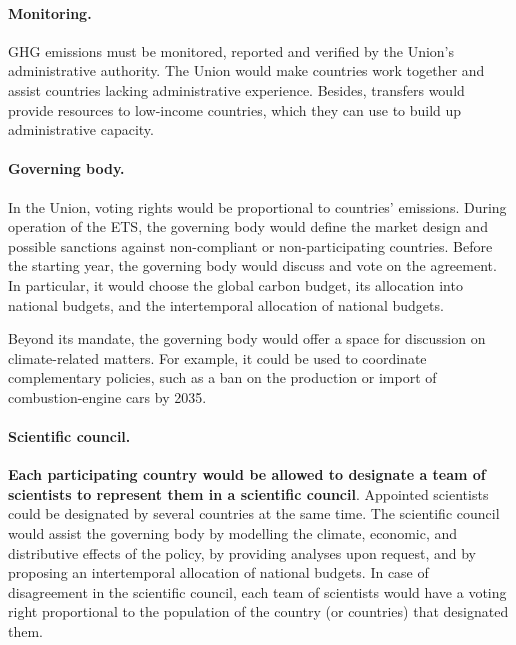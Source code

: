 \documentclass[12pt,english]{article}
\begin{document}
\paragraph{Monitoring.}
GHG emissions must be monitored, reported and verified by the Union's administrative authority. The Union would make countries work together and assist countries lacking administrative experience. Besides, transfers would provide resources to low-income countries, which they can use to build up administrative capacity. 

\paragraph{Governing body.} 
In the Union, voting rights would be proportional to countries' emissions. %
During operation of the ETS, the governing body would define the market design and possible sanctions against non-compliant or non-participating countries.  %
Before the starting year, the governing body would discuss and vote on the agreement. In particular, it would choose the global carbon budget, its allocation into national budgets, and the intertemporal allocation of national budgets. 

Beyond its mandate, the governing body would offer a space for discussion on climate-related matters. For example, it could be used to coordinate complementary policies, such as a ban on the production or import of combustion-engine cars by 2035.

\paragraph{Scientific council.}
\textbf{Each participating country would be allowed to designate a team of scientists to represent them in a scientific council}. Appointed scientists could be designated by several countries at the same time. The scientific council would assist the governing body by modelling the climate, economic, and distributive effects of the policy, by providing analyses upon request, and by proposing an intertemporal allocation of national budgets. In case of disagreement in the scientific council, each team of scientists would have a voting right proportional to the population %
of the country (or countries) that designated them.
\end{document}
